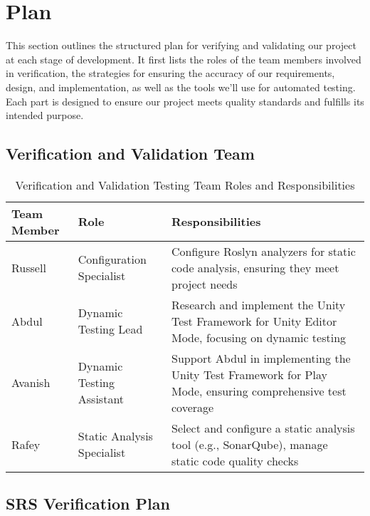 \documentclass[12pt, titlepage]{article}
\begin{document}
\newrefsection

\section{Plan}
\label{sub:plan}

This section outlines the structured plan for verifying and validating our project at each stage of development. It first lists the roles of the team members involved in verification, the strategies for ensuring the accuracy of our requirements, design, and implementation, as well as the tools we'll use for automated testing. Each part is designed to ensure our project meets quality standards and fulfills its intended purpose.

\subsection{Verification and Validation Team}

\begin{table}[h!]
  \centering
  \begin{tabularx}{\textwidth}{|l|l|X|}
    \hline
    \textbf{Team Member} & \textbf{Role}              & \textbf{Responsibilities}                                                                                  \\ \hline
    Russell              & Configuration Specialist   & Configure Roslyn analyzers for static code analysis, ensuring they meet project needs                      \\ \hline
    Abdul                & Dynamic Testing Lead       & Research and implement the Unity Test Framework for Unity Editor Mode, focusing on dynamic testing         \\ \hline
    Avanish              & Dynamic Testing Assistant  & Support Abdul in implementing the Unity Test Framework for Play Mode, ensuring comprehensive test coverage \\ \hline
    Rafey                & Static Analysis Specialist & Select and configure a static analysis tool (e.g., SonarQube), manage static code quality checks           \\ \hline
  \end{tabularx}
  \caption{Verification and Validation Testing Team Roles and Responsibilities}
\end{table}

\subsection{SRS Verification Plan}
\end{document}
